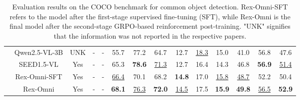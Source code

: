 \begin{table}[t]
{\begin{tabular}{cc|cc|cccccccccc}
& Qwen2.5-VL-3B             & UNK & - & \multicolumn{1}{c|}{-} & 55.7 & 77.2 & \multicolumn{1}{c|}{64.7} & 12.7 & \underline{18.3} & \multicolumn{1}{c|}{15.0} & 41.0 & 56.8 & 47.6 \\
& SEED1.5-VL                & Yes & - & \multicolumn{1}{c|}{-} & 65.3 & \textbf{78.6} & \multicolumn{1}{c|}{\underline{71.3}} & 12.7 & 16.4 & \multicolumn{1}{c|}{14.3} & 46.8 & \textbf{56.9} & \underline{51.4} \\
\rowcolor{lightblue!10}
& Rex-Omni-SFT              & Yes & - & \multicolumn{1}{c|}{-} & \underline{66.4} & 70.1 & \multicolumn{1}{c|}{68.2} & \textbf{14.8} & 17.0 & \multicolumn{1}{c|}{\underline{15.8}} & \underline{48.7} & 52.2 & 50.4 \\
\rowcolor{lightblue!10}
& Rex-Omni                  & Yes & - & \multicolumn{1}{c|}{-} & \textbf{68.1} & \underline{76.3} & \multicolumn{1}{c|}{\textbf{72.0}} & \underline{14.5} & 17.5 & \multicolumn{1}{c|}{\textbf{15.9}} & \textbf{49.8} & \underline{56.5} & \textbf{52.9} \\
\bottomrule
\end{tabular}
    }
    \caption{Evaluation results on the COCO benchmark for common object detection. Rex-Omni-SFT refers to the model after the first-stage supervised fine-tuning (SFT), while Rex-Omni is the final model after the second-stage GRPO-based reinforcement post-training. "UNK" signifies that the information was not reported in the respective papers.}
    \label{tab:common_object_detection}
\end{table}

